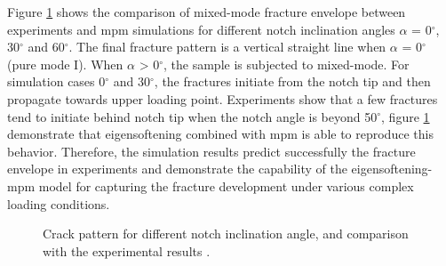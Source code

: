 \documentclass[preprint,12pt,a4paper]{elsarticle}
\begin{document}
Figure \ref{fig:Figure-Angle-Forces-test-damage-pattern} shows the
comparison of mixed-mode fracture envelope between experiments and
\acrshort{mpm} simulations for different notch inclination angles
$\alpha$ = 0$^{\circ}$, 30$^{\circ}$ and 60$^{\circ}$. The final
fracture pattern is a vertical straight line when $\alpha$ = 0$^{\circ}$  (pure mode I). 
When $\alpha$ > 0$^{\circ}$, the sample is
subjected to mixed-mode. For simulation cases 0$^{\circ}$ and 30$^{\circ}$, the fractures
initiate from the notch tip and then propagate towards upper loading
point. Experiments show that a few fractures tend to initiate behind
notch tip when the notch angle is beyond 50$^{\circ}$, figure
\ref{fig:Figure-Angle-Forces-test-damage-pattern} demonstrate that
eigensoftening combined with \acrshort{mpm} is able to reproduce this
behavior. Therefore, the simulation results predict successfully the
fracture envelope in experiments and demonstrate the capability of
the eigensoftening-\acrshort{mpm} model for capturing the fracture
development under various complex loading conditions. 
\begin{figure}
\centering
{}
\caption{Crack pattern for different notch inclination angle, and
  comparison with the experimental results  \cite{LIM_1993}.}
\label{fig:Figure-Angle-Forces-test-damage-pattern}
\end{figure}
\end{document}
